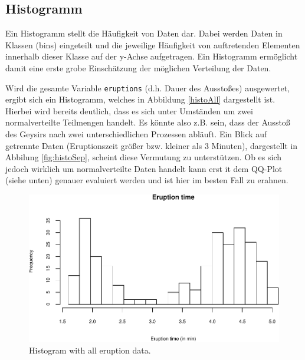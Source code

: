 \documentclass[10pt,]{article}
\begin{document}
\subsection{Histogramm}\label{histogramm}

Ein Histogramm stellt die Häufigkeit von Daten dar. Dabei werden Daten
in Klassen (bins) eingeteilt und die jeweilige Häufigkeit von
auftretenden Elementen innerhalb dieser Klasse auf der y-Achse
aufgetragen. Ein Histogramm ermöglicht damit eine erste grobe
Einschätzung der möglichen Verteilung der Daten.

Wird die gesamte Variable \texttt{eruptions} (d.h. Dauer des Ausstoßes)
ausgewertet, ergibt sich ein Histogramm, welches in Abbildung
\ref{histoAll} dargestellt ist. Hierbei wird bereits deutlich, dass es
sich unter Umständen um zwei normalverteilte Teilmengen handelt. Es
könnte also z.B. sein, dass der Ausstoß des Geysirs nach zwei
unterschiedlichen Prozessen abläuft. Ein Blick auf getrennte Daten
(Eruptionszeit größer bzw. kleiner als 3 Minuten), dargestellt in
Abbilung \ref{fig:histoSep}, scheint diese Vermutung zu unterstützen. Ob
es sich jedoch wirklich um normalverteilte Daten handelt kann erst it
dem QQ-Plot (siehe unten) genauer evaluiert werden und ist hier im
besten Fall zu erahnen.

\begin{figure}[htbp]
\centering
\includegraphics{project1_files/figure-latex/histogram 1-1.pdf}
\caption{Histogram with all eruption data.\label{fig:histoAll}}
\end{figure}
\end{document}
